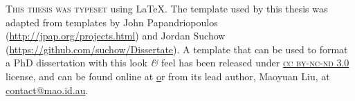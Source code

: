 
\cleartoleftpage
\par\vbox{}\null\vfill\nopagebreak

\small
\noindent
\parbox{105mm}{\textsc{This thesis was typeset} using \LaTeX. The template used by this thesis was adapted from templates by John \mbox{Papandriopoulos} (\url{http://jpap.org/projects.html}) and Jordan Suchow (\url{https://github.com/suchow/Dissertate}). A template that can be used to format a PhD dissertation with this look \textit{\&} feel has been released under \href{http://creativecommons.org/licenses/by-nc-nd/3.0/}{\textsc{cc by-nc-nd 3.0}} license, and can be found online at \href{https://github.com/XXXX} or from its lead author, Maoyuan Liu, at \mbox{\href{mailto:contact@mao.id.au}{contact@mao.id.au}}.}
